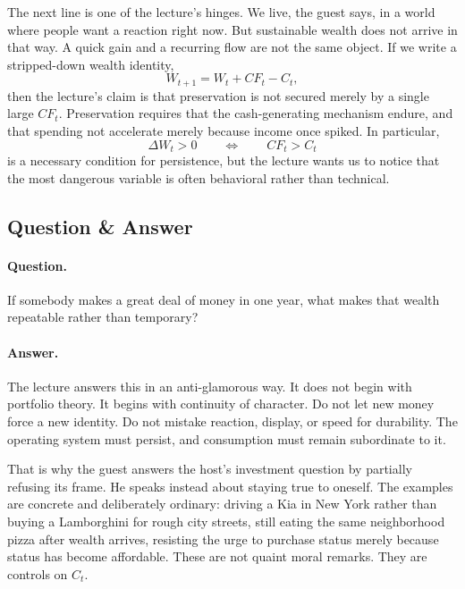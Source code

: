 The next line is one of the lecture's hinges. We live, the guest says, in a world where people want a reaction right now. But sustainable wealth does not arrive in that way. A quick gain and a recurring flow are not the same object. If we write a stripped-down wealth identity,
\begin{equation}
W_{t+1} = W_t + CF_t - C_t,
\end{equation}
then the lecture's claim is that preservation is not secured merely by a single large $CF_t$. Preservation requires that the cash-generating mechanism endure, and that spending not accelerate merely because income once spiked. In particular,
\begin{equation}
\Delta W_t > 0 \qquad \Longleftrightarrow \qquad CF_t > C_t
\end{equation}
is a necessary condition for persistence, but the lecture wants us to notice that the most dangerous variable is often behavioral rather than technical.

\subsection{Question \& Answer}

\paragraph{Question.} If somebody makes a great deal of money in one year, what makes that wealth repeatable rather than temporary?

\paragraph{Answer.} The lecture answers this in an anti-glamorous way. It does not begin with portfolio theory. It begins with continuity of character. Do not let new money force a new identity. Do not mistake reaction, display, or speed for durability. The operating system must persist, and consumption must remain subordinate to it.

That is why the guest answers the host's investment question by partially refusing its frame. He speaks instead about staying true to oneself. The examples are concrete and deliberately ordinary: driving a Kia in New York rather than buying a Lamborghini for rough city streets, still eating the same neighborhood pizza after wealth arrives, resisting the urge to purchase status merely because status has become affordable. These are not quaint moral remarks. They are controls on $C_t$.

